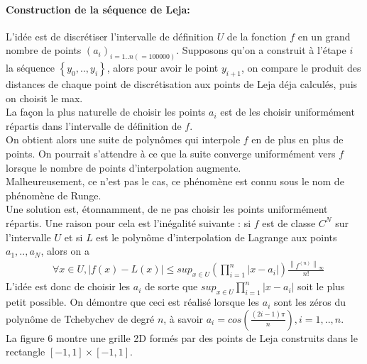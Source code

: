 \paragraph{Construction de la séquence de Leja:\\}
\hspace{0.5cm} L'idée est de discrétiser l'intervalle de définition $U$ de la fonction $f$ en un grand nombre de points $(a_i)_{i=1..n(=100000)}$.
Supposons qu'on a construit à l'étape $i$ la séquence $\left \{ y_0,..,y_i \right \}$, alors pour avoir le point $y_{i+1}$,
on compare le produit des distances de chaque point de discrétisation aux points de Leja déja calculés, puis on choisit le max.\\
La façon la plus naturelle de choisir les points $a_i$ est de les choisir uniformément répartis dans l'intervalle de définition de $f$.\\
On obtient alors une suite de polynômes qui interpole $f$ en de plus en plus de points. On pourrait s'attendre à ce que la suite converge
uniformément vers $f$ lorsque le nombre de points d'interpolation augmente.\\
Malheureusement, ce n'est pas le cas, ce phénomène est connu sous le nom de phénomène de Runge. \\
Une solution est, étonnamment, de ne pas choisir les points uniformément répartis. Une raison pour cela est l'inégalité suivante :
si $f$ est de classe $C^N$ sur l'intervalle $U$ et si $L$ est le polynôme d'interpolation de Lagrange aux points $a_1,..,a_N$, alors on a
\begin{align}
		& \forall x \in U, \left |f(x)-L(x)\right | \leq sup_{x \in U}  (\prod_{i=1}^n \left | x-a_i \right |) \frac{\left \|f^{(n)} \right \|_{\infty}}{n!}
\end{align}
\hspace{0.5cm}
L'idée est donc de choisir les $a_i$ de sorte que $sup_{x \in U}  \prod_{i=1}^n \left | x-a_i \right |$ soit le plus petit possible. On démontre que
ceci est réalisé lorsque les $a_i$ sont les zéros du polynôme de Tchebychev de degré $n$, à savoir $a_i = cos(\frac{(2i-1) \pi}{n}), i =1,..,n$.\\
La figure 6 montre une grille 2D formés par des points de Leja construits dans le rectangle  $\left [-1,1 \right ] \times \left [-1,1 \right ]$.\\
